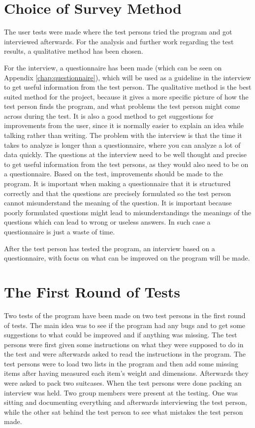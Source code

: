 \section{Choice of Survey Method}
The user tests were made where the test persons tried the program and got interviewed afterwards. For the analysis and further work regarding the test results, a qualitative method has been chosen.

For the interview, a questionnaire has been made (which can be seen on Appendix \ref{chap:questionnaire}), which will be used as a guideline in the interview to get useful information from the test person. The qualitative method is the best suited method for the project, because it gives a more specific picture of how the test person finds the program, and what problems the test person might come across during the test. It is also a good method to get suggestions for improvements from the user, since it is normally easier to explain an idea while talking rather than writing. The problem with the interview is that the time it takes to analyze is longer than a questionnaire, where you can analyze a lot of data quickly. The questions at the interview need to be well thought and precise to get useful information from the test persons, as they would also need to be on a questionnaire. Based on the test, improvements should be made to the program.
It is important when making a questionnaire that it is structured correctly and that the questions are precisely formulated so the test person cannot misunderstand the meaning of the question. It is important because poorly formulated questions might lead to misunderstandings the meanings of the questions which can lead to wrong or useless answers. In such case a questionnaire is  just a waste of time.

After the test person has tested the program, an interview based on a questionnaire, with focus on what can be improved on the program will be made.

\section{The First Round of Tests}
Two tests of the program have been made on two test persons in the first round of tests. The main idea was to see if the program had any bugs and to get some suggestions to what could be improved and if anything was missing. The test persons were first given some instructions on what they were supposed to do in the test and were afterwards asked to read the instructions in the program. The test persons were to load two lists in the program and then add some missing items after having measured each item's weight and dimensions. Afterwards they were asked to pack two suitcases. When the test persons were done packing an interview was held. Two group members were present at the testing. One was sitting and documenting everything and afterwards interviewing the test person, while the other sat behind the test person to see what mistakes the test person made.

